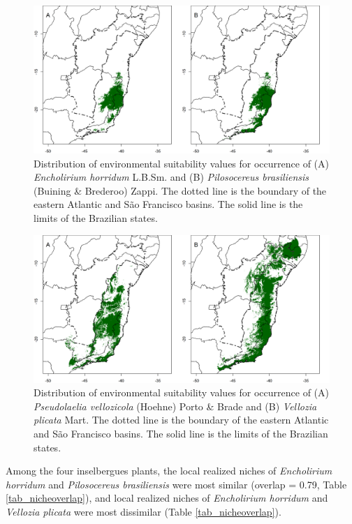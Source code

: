 \begin{figure}
 \centering
 \includegraphics[width=90 mm]{figs/mod1.png} 
 \caption{Distribution of environmental suitability values for occurrence of (A) \textit{Encholirium horridum} L.B.Sm. and (B) \textit{Pilosocereus brasiliensis} (Buining \& Brederoo) Zappi. The dotted line is the boundary of the eastern Atlantic and São Francisco basins. The solid line is the limits of the Brazilian states.}
  \label{mod1}
\end{figure}

\begin{figure}
 \centering
 \includegraphics[width=90 mm]{figs/mod2.png} 
 \caption{Distribution of environmental suitability values for occurrence of (A)  \textit{Pseudolaelia vellozicola} (Hoehne) Porto \& Brade and (B) \textit{Vellozia plicata} Mart. The dotted line is the boundary of the eastern Atlantic and São Francisco basins. The solid line is the limits of the Brazilian states.}
  \label{mod2}
\end{figure}



Among the four inselbergues plants, the local realized niches of \textit{Encholirium horridum} and \textit{Pilosocereus brasiliensis} were most similar (overlap = 0.79, Table \ref{tab_nicheoverlap}), and local realized niches of \textit{Encholirium horridum} and \textit{Vellozia plicata} were most dissimilar (Table \ref{tab_nicheoverlap}).

